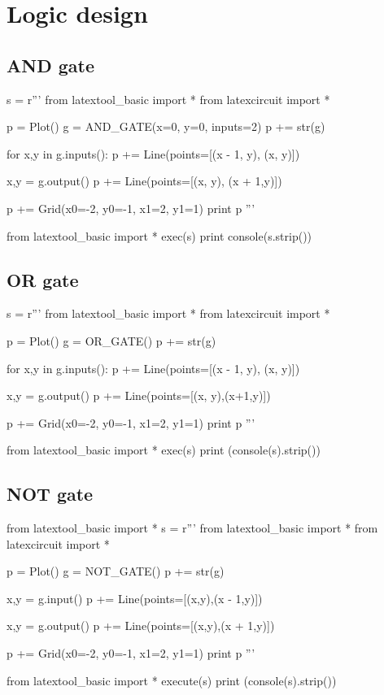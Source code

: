 \newpage
\section{Logic design}

\subsection{AND gate}
\begin{python}
s = r'''
from latextool_basic import *
from latexcircuit import *

p = Plot()
g = AND_GATE(x=0, y=0, inputs=2)
p += str(g)

for x,y in g.inputs():
    p += Line(points=[(x - 1, y), (x, y)])

x,y = g.output()
p += Line(points=[(x, y), (x + 1,y)])

p += Grid(x0=-2, y0=-1, x1=2, y1=1)
print p
'''

from latextool_basic import *
exec(s)
print console(s.strip())
\end{python}





\newpage
\subsection{OR gate}
\begin{python}
s = r'''
from latextool_basic import *
from latexcircuit import *

p = Plot()
g = OR_GATE()
p += str(g)

for x,y in g.inputs():
    p += Line(points=[(x - 1, y), (x, y)])

x,y = g.output()
p += Line(points=[(x, y),(x+1,y)])

p += Grid(x0=-2, y0=-1, x1=2, y1=1)
print p
'''

from latextool_basic import *
exec(s)
print (console(s).strip())
\end{python}


\newpage
\subsection{NOT gate}
\begin{python}
from latextool_basic import *
s = r'''
from latextool_basic import *
from latexcircuit import *

p = Plot()
g = NOT_GATE()
p += str(g)

x,y = g.input()
p += Line(points=[(x,y),(x - 1,y)])

x,y = g.output()
p += Line(points=[(x,y),(x + 1,y)])

p += Grid(x0=-2, y0=-1, x1=2, y1=1)
print p
'''

from latextool_basic import *
execute(s)
print (console(s).strip())
\end{python}





